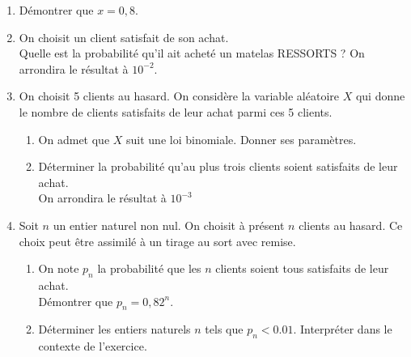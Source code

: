 \documentclass[11pt,fleqn, openany]{book} %
\begin{document}
\begin{exercise}[subtitle={(Réunion 2023)}]
\begin{enumerate}
\item Démontrer que $x = 0,8$.
\item On choisit un client satisfait de son achat. \\ Quelle est la probabilité qu'il ait acheté un matelas RESSORTS ? On arrondira le résultat à $10^{-2}$.

\item On choisit 5 clients au hasard.
On considère la variable aléatoire $X$ qui donne le nombre de clients satisfaits de leur achat
parmi ces 5 clients.
\begin{enumerate}
\item On admet que $X$ suit une loi binomiale. Donner ses paramètres.
\item Déterminer la probabilité qu'au plus trois clients soient satisfaits de leur achat. \\ On arrondira le résultat à $10^{-3}$
\end{enumerate}
\item Soit $n$ un entier naturel non nul. On choisit à présent $n$ clients au hasard. Ce choix peut être assimilé à un tirage au sort avec
remise.
\begin{enumerate}
\item On note $p_n$ la probabilité que les $n$ clients soient tous satisfaits de leur achat. \\Démontrer que $p_n = 0,82^n$.
\item Déterminer les entiers naturels $n$ tels que $p_n<0.01$. Interpréter dans le contexte de l'exercice.
\end{enumerate}
\end{enumerate}
\end{exercise}
\end{document}
